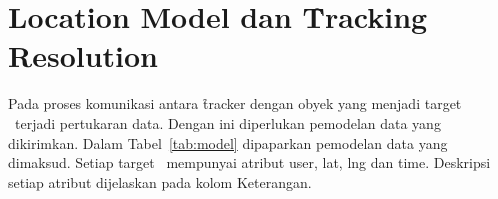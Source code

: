 







\section{Location Model dan \f{Tracking Resolution}}

Pada proses komunikasi antara \f{tracker} dengan obyek yang menjadi target
\tracking~terjadi pertukaran data. Dengan ini diperlukan pemodelan data yang
dikirimkan. Dalam Tabel~\ref{tab:model} dipaparkan pemodelan data yang dimaksud.
Setiap target \tracking~mempunyai atribut user, lat, lng dan time.  Deskripsi
setiap atribut dijelaskan pada kolom Keterangan.

